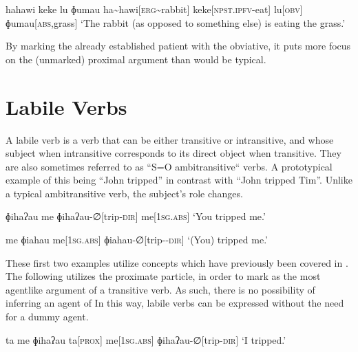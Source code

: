 \ex
\begingl
\glpreamble hahawi keke lu ɸumau
\endpreamble
ha\textasciitilde hawi[\textsc{erg\textasciitilde}rabbit]
keke[\textsc{npst.ipfv-}eat]
lu[\textsc{obv}]
ɸumau[\textsc{abs,}grass]
\glft `The rabbit (as opposed to something else) is eating the grass.'
\endgl
\xe

By marking the already established patient with the obviative\footnotemark, it puts more focus on the (unmarked) proximal argument than would be typical.


\section{Labile Verbs}\label{sec:labile_verbs}

A labile verb is a verb that can be either transitive or intransitive, and whose subject when intransitive corresponds to its direct object when transitive. They are also sometimes referred to as ``S=O ambitransitive`` verbs. A prototypical example of this being ``John tripped'' in contrast with ``John tripped Tim''. Unlike a typical ambitransitive verb, the subject's role changes.

\ex
\begingl
\glpreamble ɸihaʔau me
\endpreamble
ɸihaʔau-∅[trip\textsc{-dir}]
me[\textsc{1sg.abs}]
\glft `You tripped me.'
\endgl
\xe

\ex
\begingl
\glpreamble me ɸiahau
\endpreamble
me[\textsc{1sg.abs}]
ɸiahau-∅[trip-\textsc{-dir}]
\glft `(You) tripped me.'
\endgl
\xe

These first two examples utilize concepts which have previously been covered in . The following utilizes the proximate particle,  in order to mark  as the most agentlike argument of a transitive verb. As such, there is no possibility of inferring an agent of  In this way, labile verbs can be expressed without the need for a dummy agent.

\ex
\begingl
\glpreamble ta me ɸihaʔau
\endpreamble
ta[\textsc{prox}]
me[\textsc{1sg.abs}]
ɸihaʔau-∅[trip\textsc{-dir}]
\glft `I tripped.'
\endgl
\xe
